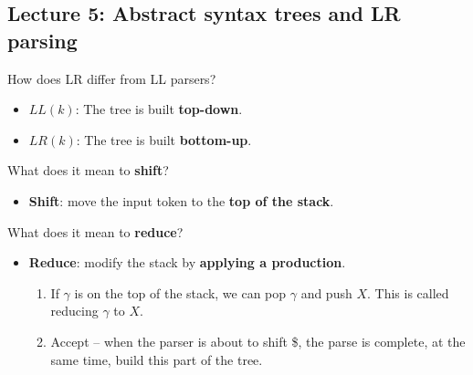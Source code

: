 \documentclass[11pt]{beamer}
\begin{document}
\subsection{Lecture 5: Abstract syntax trees and LR parsing}
\begin{frame}

\begin{block}{How does LR differ from LL parsers?}
\begin{itemize}
\item $LL(k)$: The tree is built \textbf{top-down}.
\item $LR(k)$: The tree is built \textbf{bottom-up}.
\end{itemize}
\end{block}

\begin{block}{What does it mean to \textbf{shift}?}
\begin{itemize}
\item \textbf{Shift}: move the input token to the \textbf{top of the stack}.
\end{itemize}
\end{block}



\begin{block}{What does it mean to \textbf{reduce}?}
\begin{itemize}
\item \textbf{Reduce}: modify the stack by \textbf{applying a production}.
\begin{enumerate}
\item If $\gamma$ is on the top of the stack, we can pop $\gamma$ and push $X$. This is called reducing $\gamma$ to $X$.
\item Accept – when the parser is about to shift \$, the parse is complete, at the same time, build this part of the tree.
\end{enumerate}
\end{itemize}
\end{block}

\end{frame}
\end{document}
